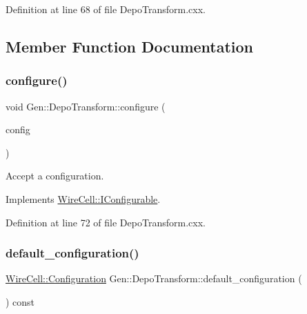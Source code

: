 Definition at line 68 of file Depo\+Transform.\+cxx.



\subsection{Member Function Documentation}
\mbox{\label{class_wire_cell_1_1_gen_1_1_depo_transform_ad9fc35a8293b4379fe5d6e34e7f3aee7}} 
\subsubsection{\texorpdfstring{configure()}{configure()}}
{\footnotesize\ttfamily void Gen\+::\+Depo\+Transform\+::configure (\begin{DoxyParamCaption}\item[{const \hyperlink{namespace_wire_cell_a9f705541fc1d46c608b3d32c182333ee}{Wire\+Cell\+::\+Configuration} \&}]{config }\end{DoxyParamCaption})\hspace{0.3cm}{\ttfamily [virtual]}}



Accept a configuration. 



Implements \hyperlink{class_wire_cell_1_1_i_configurable_a57ff687923a724093df3de59c6ff237d}{Wire\+Cell\+::\+I\+Configurable}.



Definition at line 72 of file Depo\+Transform.\+cxx.

\mbox{\label{class_wire_cell_1_1_gen_1_1_depo_transform_aa3f2c3fcf0aae6b353296fd5d784cb8d}} 
\subsubsection{\texorpdfstring{default\+\_\+configuration()}{default\_configuration()}}
{\footnotesize\ttfamily \hyperlink{namespace_wire_cell_a9f705541fc1d46c608b3d32c182333ee}{Wire\+Cell\+::\+Configuration} Gen\+::\+Depo\+Transform\+::default\+\_\+configuration (\begin{DoxyParamCaption}{ }\end{DoxyParamCaption}) const\hspace{0.3cm}{\ttfamily [virtual]}}



